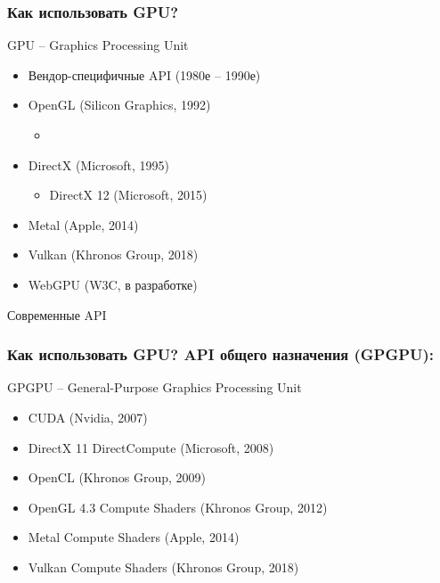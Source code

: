 \documentclass{beamer}
\begin{document}
\begin{frame}
\frametitle{Как использовать GPU? }
GPU -- Graphics Processing Unit
\pause
\pause
\begin{itemize}
\item Вендор-специфичные API (1980е -- 1990е)
\pause
\item OpenGL (Silicon Graphics, 1992)
\pause
\begin{itemize}
\item {}
\end{itemize}
\pause
\item DirectX (Microsoft, 1995)
\pause
\begin{itemize}
\item {DirectX 12 (Microsoft, 2015)}
\end{itemize}
\pause
\item {\only<11->{\color{red}}Metal (Apple, 2014)}
\pause
\item {Vulkan (Khronos Group, 2018)}
\pause
\item {WebGPU (W3C, в разработке)}
\end{itemize}
\pause
\bigskip
{\color{red}Современные API}
\end{frame}

\begin{frame}
\frametitle{Как использовать GPU? API общего назначения (GPGPU):}
GPGPU -- General-Purpose Graphics Processing Unit
\pause
\begin{itemize}
\item CUDA (Nvidia, 2007)
\pause
\item DirectX 11 DirectCompute (Microsoft, 2008)
\pause
\item OpenCL (Khronos Group, 2009)
\pause
\item OpenGL 4.3 Compute Shaders (Khronos Group, 2012)
\pause
\item Metal Compute Shaders (Apple, 2014)
\pause
\item Vulkan Compute Shaders (Khronos Group, 2018)
\end{itemize}
\end{frame}
\end{document}
